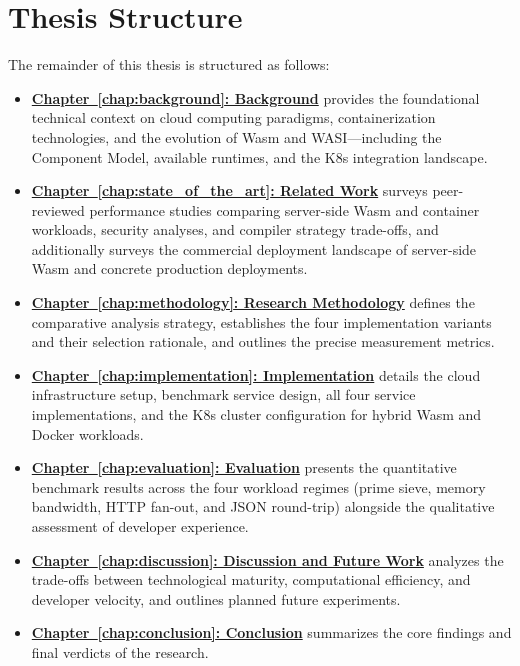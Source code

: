 \section{Thesis Structure}
The remainder of this thesis is structured as follows:
\begin{itemize}
    \item \hyperref[chap:background]{\textbf{Chapter~\ref{chap:background}: Background}} provides the foundational technical context on cloud computing paradigms, containerization technologies, and the evolution of \acs{Wasm} and \acs{WASI}---including the Component Model, available runtimes, and the \acs{K8s} integration landscape.
    \item \hyperref[chap:state_of_the_art]{\textbf{Chapter~\ref{chap:state_of_the_art}: Related Work}} surveys peer-reviewed performance studies comparing server-side \acs{Wasm} and container workloads, security analyses, and compiler strategy trade-offs, and additionally surveys the commercial deployment landscape of server-side \acs{Wasm} and concrete production deployments.
    \item \hyperref[chap:methodology]{\textbf{Chapter~\ref{chap:methodology}: Research Methodology}} defines the comparative analysis strategy, establishes the four implementation variants and their selection rationale, and outlines the precise measurement metrics.
    \item \hyperref[chap:implementation]{\textbf{Chapter~\ref{chap:implementation}: Implementation}} details the cloud infrastructure setup, benchmark service design, all four service implementations, and the \acs{K8s} cluster configuration for hybrid \acs{Wasm} and Docker workloads.
    \item \hyperref[chap:evaluation]{\textbf{Chapter~\ref{chap:evaluation}: Evaluation}} presents the quantitative benchmark results across the four workload regimes (prime sieve, memory bandwidth, HTTP fan-out, and \acs{JSON} round-trip) alongside the qualitative assessment of developer experience.
    \item \hyperref[chap:discussion]{\textbf{Chapter~\ref{chap:discussion}: Discussion and Future Work}} analyzes the trade-offs between technological maturity, computational efficiency, and developer velocity, and outlines planned future experiments.
    \item \hyperref[chap:conclusion]{\textbf{Chapter~\ref{chap:conclusion}: Conclusion}} summarizes the core findings and final verdicts of the research.
\end{itemize}
